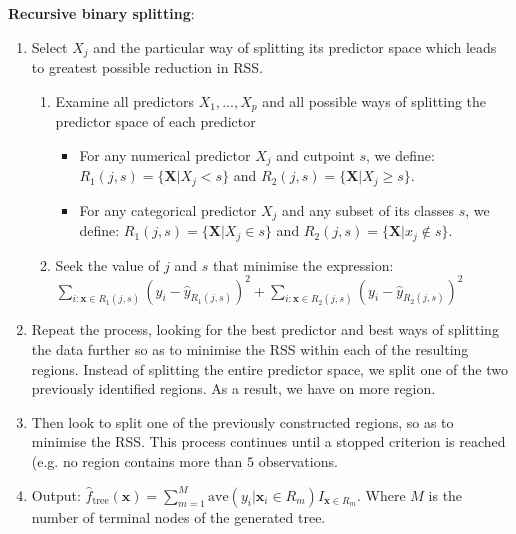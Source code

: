 \documentclass[11pt]{article}
\begin{document}
\noindent  \textbf{Recursive binary splitting}:
\begin{enumerate}
    \item Select $X_j$ and the particular way of splitting its predictor space which leads to greatest possible reduction in RSS.
        \begin{enumerate}[label=\roman*]
            \item Examine all predictors $X_1,...,X_p$ and all possible ways of splitting the predictor space of each predictor
                \begin{itemize}
                    \item For any numerical predictor $X_j$ and cutpoint $s$, we define: $R_1(j,s) = \{ \boldsymbol{X}|X_j < s \}$ and $R_2(j,s) = \{ 
                    \boldsymbol{X}|X_j \geq s \}$.
                    \item For any categorical predictor $X_j$ and any subset of its classes $s$, we define: $R_1(j,s) = \{ \boldsymbol{X}|X_j \in s \}$ and $R_2(j,s) = \{ \boldsymbol{X}|x_j \notin s \}$.
                \end{itemize}
            \item Seek the value of $j$ and $s$ that minimise the expression: $\sum_{i: \boldsymbol{x} \in R_1(j,s)}{(y_i - \hat{y}_{R_1(j,s)})^2} + \sum_{i: \boldsymbol{x}\in R_2(j,s)}{(y_i - \hat{y}_{R_2(j,s)})^2}$
        \end{enumerate}
    \item Repeat the process, looking for the best predictor and best ways of splitting the data further so as to minimise the RSS within each of the resulting regions. Instead of splitting the entire predictor space, we split one of the two previously identified regions. As a result, we have on more region.
    \item Then look to split one of the previously constructed regions, so as to minimise the RSS. This process continues until a stopped criterion is reached (e.g. no region contains more than $5$ observations.
    \item Output: $\hat{f}_{\text{tree}}(\boldsymbol{x}) = \sum_{m=1}^{M} \text{ave}(y_i|\boldsymbol{x}_i \in R_m)I_{\boldsymbol{x} \in R_m}$. Where $M$ is the number of terminal nodes of the generated tree.
\end{enumerate}
\phantom{i} \\
\end{document}
